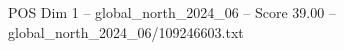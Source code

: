 \begin{textsample}{POS Dim 1 – global\_north\_2024\_06 – Score 39.00 – global\_north\_2024\_06/109246603.txt}
\end{textsample}
